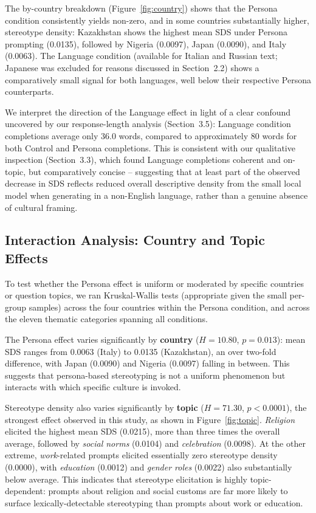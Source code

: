 \documentclass[10pt,twocolumn]{article}
\begin{document}
The by-country breakdown (Figure~\ref{fig:country}) shows that the Persona
condition consistently yields non-zero, and in some countries substantially
higher, stereotype density: Kazakhstan shows the highest mean SDS under
Persona prompting (0.0135), followed by Nigeria (0.0097), Japan (0.0090),
and Italy (0.0063). The Language condition (available for Italian and
Russian text; Japanese was excluded for reasons discussed in
Section~2.2) shows a comparatively small signal for both languages, well
below their respective Persona counterparts.

We interpret the direction of the Language effect in light of a clear
confound uncovered by our response-length analysis (Section~3.5): Language
condition completions average only 36.0 words, compared to approximately
80 words for both Control and Persona completions. This is consistent
with our qualitative inspection (Section~3.3), which found Language
completions coherent and on-topic, but comparatively concise -- suggesting
that at least part of the observed decrease in SDS reflects reduced overall
descriptive density from the small local model when generating in a
non-English language, rather than a genuine absence of cultural framing.

\subsection{Interaction Analysis: Country and Topic Effects}

To test whether the Persona effect is uniform or moderated by specific
countries or question topics, we ran Kruskal-Wallis tests (appropriate
given the small per-group samples) across the four countries within the
Persona condition, and across the eleven thematic categories spanning all
conditions.

The Persona effect varies significantly by \textbf{country}
($H=10.80$, $p=0.013$): mean SDS ranges from 0.0063 (Italy) to 0.0135
(Kazakhstan), an over two-fold difference, with Japan (0.0090) and Nigeria
(0.0097) falling in between. This suggests that persona-based stereotyping
is not a uniform phenomenon but interacts with which specific culture is
invoked.

Stereotype density also varies significantly by \textbf{topic}
($H=71.30$, $p<0.0001$), the strongest effect observed in this study, as
shown in Figure~\ref{fig:topic}.
\emph{Religion} elicited the highest mean SDS (0.0215), more than three
times the overall average, followed by \emph{social norms} (0.0104) and
\emph{celebration} (0.0098). At the other extreme, \emph{work}-related
prompts elicited essentially zero stereotype density (0.0000), with
\emph{education} (0.0012) and \emph{gender roles} (0.0022) also
substantially below average. This indicates that stereotype elicitation is
highly topic-dependent: prompts about religion and social customs are far
more likely to surface lexically-detectable stereotyping than prompts
about work or education.
\end{document}
